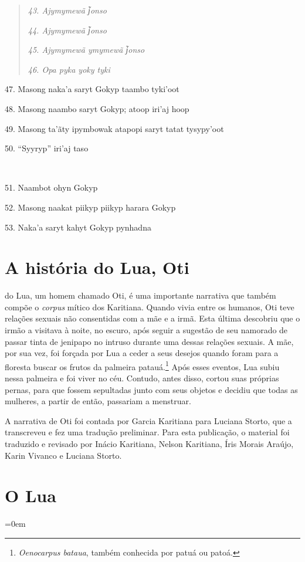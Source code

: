 \begin{quote}
\forceindent\emph{43. Ajymymewã j͂onso}

\emph{44. Ajymymewã j͂onso}

\emph{45. Ajymymewã ymymewã j͂onso}

\emph{46. Opa pyka yoky tyki}
\end{quote}

47. Masong naka'a saryt Gokyp taambo tyki'oot

48. Masong naambo saryt Gokyp; atoop iri'aj hoop

49. Masong ta'ãty ipymbowak atapopi saryt tatat tysypy'oot

50. ``Syyryp'' iri'aj taso

~

51. Naambot ohyn Gokyp

52. Masong naakat piikyp piikyp harara Gokyp

53. Naka'a saryt kahyt Gokyp pynhadna

\endgroup

\chapter{A história do Lua, Oti}

 do Lua, um homem chamado Oti, é uma importante narrativa que
também compõe o \emph{corpus} mítico dos Karitiana. Quando vivia entre
os humanos, Oti teve relações sexuais não consentidas com a mãe e a
irmã. Esta última descobriu que o irmão a visitava à noite, no escuro,
após seguir a sugestão de seu namorado de passar tinta de jenipapo no
intruso durante uma dessas relações sexuais. A mãe, por sua vez, foi
forçada por Lua a ceder a seus desejos quando foram para a floresta
buscar os frutos da palmeira patauá.\footnote{\emph{Oenocarpus bataua},
  também conhecida por patuá ou patoá.} Após esses eventos, Lua subiu
nessa palmeira e foi viver no céu. Contudo, antes disso, cortou suas
próprias pernas, para que fossem sepultadas junto com seus objetos e
decidiu que todas as mulheres, a partir de então, passariam a menstruar.

A narrativa de Oti foi contada por Garcia Karitiana para Luciana Storto,
que a transcreveu e fez uma tradução preliminar. Para esta publicação, o
material foi traduzido e revisado por Inácio Karitiana, Nelson
Karitiana, Íris Morais Araújo, Karin Vivanco e Luciana Storto.


\chapter*{O Lua}
\begingroup\parindent=0em


